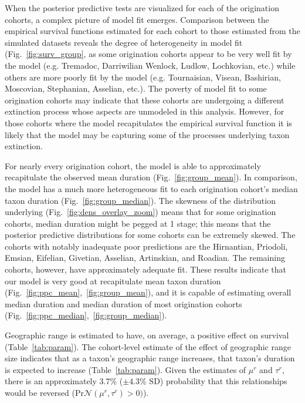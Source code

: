 \documentclass[11pt]{article}
\begin{document}
When the posterior predictive tests are visualized for each of the origination cohorts, a complex picture of model fit emerges. Comparison between the empirical survival functions estimated for each cohort to those estimated from the simulated datasets reveals the degree of heterogeneity in model fit (Fig.~\ref{fig:surv_group}, as some origination cohorts appear to be very well fit by the model (e.g. Tremadoc, Darriwilian Wenlock, Ludlow, Lochkovian, etc.) while others are more poorly fit by the model (e.g. Tournaisian, Visean, Bashirian, Moscovian, Stephanian, Asselian, etc.). The poverty of model fit to some origination cohorts may indicate that these cohorts are undergoing a different extinction process whose aspects are unmodeled in this analysis. However, for those cohorts where the model recapitulates the empirical survival function it is likely that the model may be capturing some of the processes underlying taxon extinction.

For nearly every origination cohort, the model is able to approximately recapitulate the observed mean duration (Fig.~\ref{fig:group_mean}). In comparison, the model has a much more heterogeneous fit to each origination cohort's median taxon duration (Fig.~\ref{fig:group_median}). The skewness of the distribution underlying (Fig.~\ref{fig:dens_overlay_zoom}) means that for some origination cohorts, median duration might be pegged at 1 stage; this means that the posterior predictive distributions for some cohorts can be extremely skewed. The cohorts with notably inadequate poor predictions are the Hirnantian, Priodoli, Emsian, Eifelian, Givetian, Asselian, Artinskian, and Roadian. The remaining cohorts, however, have approximately adequate fit. These results indicate that our model is very good at recapitulate mean taxon duration (Fig.~\ref{fig:ppc_mean},~\ref{fig:group_mean}), and it is capable of estimating overall median duration and median duration of most origination cohorts (Fig.~\ref{fig:ppc_median},~\ref{fig:group_median}).


Geographic range is estimated to have, on average, a positive effect on survival (Table~\ref{tab:param}). The cohort-level estimate of the effect of geographic range size indicates that as a taxon's geographic range increases, that taxon's duration is expected to increase (Table~\ref{tab:param}). Given the estimates of \(\mu^{r}\) and \(\tau^{r}\), there is an approximately 3.7\% (\(\pm 4.3\%\) SD) probability that this relationships would be reversed (\(\mathrm{Pr}\mathcal{N}(\mu^{r}, \tau^{r}) > 0)\)). 
\end{document}
